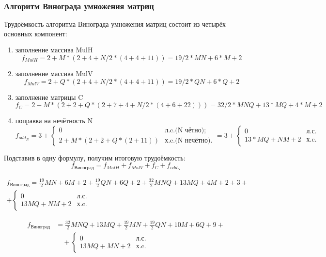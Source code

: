 \subsubsection{Алгоритм Винограда умножения матриц}

Трудоёмкость алгоритма Винограда умножения матриц состоит из четырёх основных компонент:

\begin{enumerate}

\item заполнение массива MulH
\begin{equation}
f_{MulH} = 2 + M * (2 + 4 + N/2 * (4 + 4 + 11)) = 19/2 * MN + 6 * M + 2
\end{equation}

\item заполнение массива MulV
\begin{equation}
f_{MulV} = 2 + Q * (2 + 4 + N/2 * (4 + 4 + 11)) = 19/2 * QN + 6 * Q + 2
\end{equation}

\item заполнение матрицы C
\begin{equation}
f_C = 2 + M * (2 + 2 + Q * (2 + 7 + 4 + N/2 * (4 + 6 + 22))) = 32/2 * MNQ + 13 * MQ + 4 * M + 2
\end{equation}


\item поправка на нечётность N
\begin{equation}
f_{odd_N} = 3 + 
    \begin{cases}
      0 & \text{л.c.(N чётно)}; \\
      2 + M * (2 + 2 + Q * (2 + 11)) & \text{х.c.(N нечётно)}.
    \end{cases}
= 3 +
	\begin{cases}
      0 & \text{л.с.} \\
      13 * MQ + NM + 2 & \text{х.c.}
    \end{cases}
\end{equation}

\end{enumerate}

Подставив в одну формулу, получим итоговую трудоёмкость:
\[f_{\text{Виноград}} = f_{MulH} + f_{MulV} + f_C + f_{odd_N}\]

\begin{multline}
f_{\text{Виноград}} = \frac{19}{2} MN + 6M + 2 + \frac{19}{2} QN + 6Q + 2 + \frac{32}{2} MNQ + 13MQ + 4M + 2 + 3 + \\
+ \begin{cases}
0 & \text{л.с.} \\
13MQ + NM + 2 & \text{х.c.}
\end{cases}
\end{multline}

\begin{equation}
\begin{aligned}
f_{\text{Виноград}} &= \frac{32}{2} MNQ + 13 MQ + \frac{19}{2} MN + \frac{19}{2} QN + 10 M + 6 Q + 9 + \\
&\quad + \begin{cases}
0 & \text{л.с.} \\
13 MQ + MN + 2 & \text{х.c.}
\end{cases}
\end{aligned}
\end{equation}

\newpage